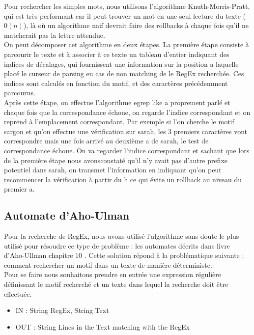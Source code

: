 \documentclass{article}
\begin{document}
Pour rechercher les simples mots, nous utilisons l'algorithme Knuth-Morris-Pratt, qui est très performant car il peut trouver un mot en une seul lecture du texte ($0(n)$), là où un algorithme naif devrait faire des rollbacks à chaque fois qu'il ne matcherait pas la lettre attendue.\\

On peut décomposer cet algorithme en deux étapes. La première étape consiste à parcourir le texte et à associer à ce texte un tableau d’entier indiquant des indices de décalages, qui fournissent une information sur la position a laquelle placé le curseur de parsing en cas de non matching de le RegEx
recherchée. Ces indices sont calculés en fonction du motif, et des caractères précédemment parcourus.\\

Après cette étape, on effectue l’algorithme egrep like a proprement parlé et chaque fois que la correspondance échoue, on regarde l’indice correspondant et on reprend à l’emplacement correspondant. Par exemple si l’on cherche le motif sargon et qu’on effectue une vérification sur sarah, les 3 premiers caractères vont correspondre mais une fois arrivé au deuxième a de sarah, le test de correspondance échoue. On va regarder l’indice correspondant et sachant que lors de la première étape nous avonsconstaté qu’il n’y avait pas d’autre prefixe potentiel dans sarah, on transmet l’information en indiquant qu’on peut recommencer la vérification à partir du h ce qui évite un rollback au niveau du premier a.


\subsection{Automate d'Aho-Ulman}

Pour la recherche de RegEx, nous avons utilisé l'algorithme sans doute le plus utilisé pour résoudre ce type de problème : les automates décrits dans livre d’Aho-Ullman chapitre 10 \cite{AhoUllman}. Cette solution répond à la problématique suivante : comment rechercher un motif dans un texte de manière déterministe.\\
Pour se faire nous souhaitons prendre en entrée une expression régulière définissant le motif recherché et un texte dans lequel la recherche doit être effectuée.\\

\begin{itemize}
\item IN : String RegEx, String Text
\item OUT : String Lines in the Text matching with the RegEx\\
\end{itemize}
\end{document}
